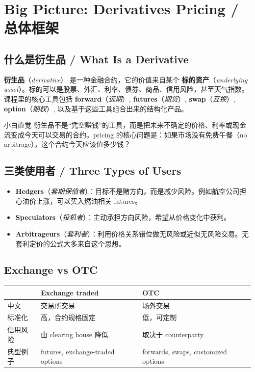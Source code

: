 \documentclass[11pt,a4paper,openany]{ctexbook}
\newcommand{\term}[2]{\textbf{#1}（\emph{#2}）}
\newcommand{\source}[1]{\par\smallskip\noindent{\small\textcolor{muted}{Source: #1}}\par}
\begin{document}
\mainmatter

\chapter{Big Picture: Derivatives Pricing / 总体框架}
\source{Lecture 1; syllabus}

\section{什么是衍生品 / What Is a Derivative}
\term{衍生品}{derivative} 是一种金融合约，它的价值来自某个 \term{标的资产}{underlying asset}。标的可以是股票、外汇、利率、债券、商品、信用风险，甚至天气指数。课程里的核心工具包括 \term{forward}{远期}, \term{futures}{期货}, \term{swap}{互换}, \term{option}{期权}, 以及基于这些工具组合出来的结构化产品。

\begin{intuitionbox}{小白直觉}
衍生品不是“凭空赚钱”的工具，而是把未来不确定的价格、利率或现金流变成今天可以交易的合约。pricing 的核心问题是：如果市场没有免费午餐（no arbitrage），这个合约今天应该值多少钱？
\end{intuitionbox}

\section{三类使用者 / Three Types of Users}
\begin{itemize}
  \item \term{Hedgers}{套期保值者}：目标不是赌方向，而是减少风险。例如航空公司担心油价上涨，可以买入燃油相关 futures。
  \item \term{Speculators}{投机者}：主动承担方向风险，希望从价格变化中获利。
  \item \term{Arbitrageurs}{套利者}：利用价格关系错位做无风险或近似无风险交易。无套利定价的公式大多来自这个思想。
\end{itemize}

\section{Exchange vs OTC}
{\small
\begin{tabular}{@{}>{\raggedright\arraybackslash}p{}>{\raggedright\arraybackslash}p{}>{\raggedright\arraybackslash}p{}@{}}
\toprule
 & \textbf{Exchange traded} & \textbf{OTC} \\
\midrule
中文 & 交易所交易 & 场外交易 \\
标准化 & 高，合约规格固定 & 低，可定制 \\
信用风险 & 由 clearing house 降低 & 取决于 counterparty \\
典型例子 & futures, exchange-traded options & forwards, swaps, customized options \\
\bottomrule
\end{tabular}
}
\end{document}
